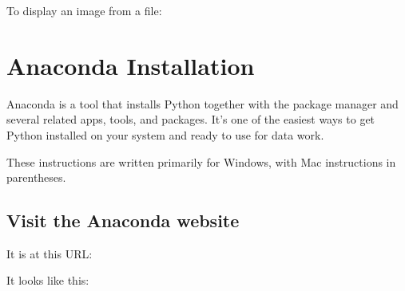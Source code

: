 \documentclass[letterpaper,10pt,english]{jupyterBook}
\begin{document}
\sphinxAtStartPar
To display an image from a file:

\begin{sphinxVerbatim}[commandchars=\\\{\}]
    
  
             
    
   
   
\end{sphinxVerbatim}


\chapter{Anaconda Installation}
\label{\detokenize{anaconda-installation:anaconda-installation}}\label{\detokenize{anaconda-installation::doc}}
\sphinxAtStartPar
Anaconda is a tool that installs Python together with the  package
manager and several related apps, tools, and packages.  It’s one of the
easiest ways to get Python installed on your system and ready to use for
data work.

\sphinxAtStartPar
These instructions are written primarily for Windows, with Mac
instructions in parentheses.


\section{Visit the Anaconda website}
\label{\detokenize{anaconda-installation:visit-the-anaconda-website}}
\sphinxAtStartPar
It is at this URL:

\sphinxAtStartPar
It looks like this:
\end{document}
